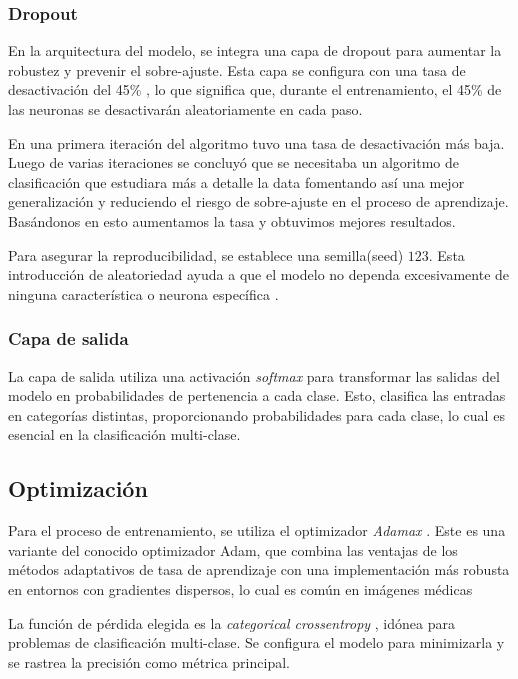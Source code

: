 \subsubsection{Dropout}

En la arquitectura del modelo, se integra una capa de dropout para aumentar la robustez y prevenir el sobre-ajuste. Esta capa se configura con una tasa de desactivación del 45\% , lo que significa que, durante el entrenamiento, el 45\% de las neuronas se desactivarán aleatoriamente en cada paso. 

En una primera iteración del algoritmo tuvo una tasa de desactivación más baja. Luego de varias iteraciones se concluyó que se necesitaba un algoritmo de clasificación que estudiara más a detalle la data fomentando así una mejor generalización y reduciendo el riesgo de sobre-ajuste en el proceso de aprendizaje. Basándonos en esto aumentamos la tasa y obtuvimos mejores resultados.

Para asegurar la reproducibilidad, se establece una semilla(seed) $123$. Esta introducción de aleatoriedad ayuda a que el modelo no dependa excesivamente de ninguna característica o neurona específica .

\subsubsection{Capa de salida}

La capa de salida utiliza una activación \textit{softmax} para transformar las salidas del modelo en probabilidades de pertenencia a cada clase. Esto, clasifica las entradas en categorías distintas, proporcionando probabilidades para cada clase, lo cual es esencial en la clasificación multi-clase.

\subsection{Optimización}

Para el proceso de entrenamiento, se utiliza el optimizador \textit{Adamax} . Este es una variante del conocido optimizador Adam, que combina las ventajas de los métodos adaptativos de tasa de aprendizaje con una implementación más robusta en entornos con gradientes dispersos, lo cual es común en imágenes médicas 

La función de pérdida elegida es la \textit{categorical crossentropy} , idónea para problemas de clasificación multi-clase. Se configura el modelo para minimizarla y se rastrea la precisión como métrica principal.

